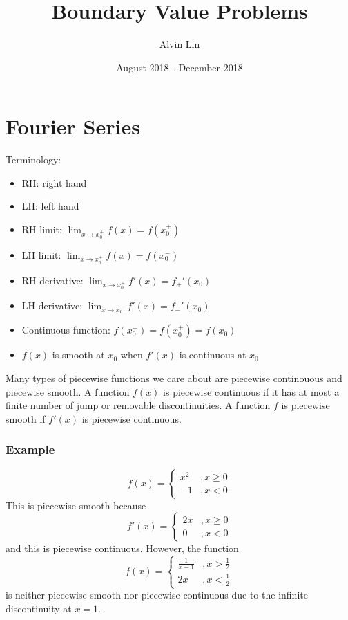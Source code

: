 \documentclass{math}
\title{Boundary Value Problems}
\author{Alvin Lin}
\date{August 2018 - December 2018}
\begin{document}
\maketitle

\section*{Fourier Series}
Terminology:
\begin{itemize}
  \item RH: right hand
  \item LH: left hand
  \item RH limit: \( \lim_{x\to x_0^+}f(x) = f(x_0^+) \)
  \item LH limit: \( \lim_{x\to x_0^+}f(x) = f(x_0^-) \)
  \item RH derivative: \( \lim_{x\to x_0^+}f'(x) = f_+'(x_0) \)
  \item LH derivative: \( \lim_{x\to x_0^-}f'(x) = f_-'(x_0) \)
  \item Continuous function: \( f(x_0^-) = f(x_0^+) = f(x_0) \)
  \item \( f(x) \) is smooth at \( x_0 \) when \( f'(x) \) is continuous at
    \( x_0 \)
\end{itemize}
Many types of piecewise functions we care about are piecewise continouous and
piecewise smooth. A function \( f(x) \) is piecewise continuous if it has at
most a finite number of jump or removable discontinuities. A function \( f \) is
piecewise smooth if \( f'(x) \) is piecewise continuous.

\subsubsection*{Example}
\[ f(x) = \begin{cases}
  x^2 &, x\ge0 \\
  -1 &, x<0
\end{cases} \]
This is piecewise smooth because
\[ f'(x) = \begin{cases}
  2x &, x\ge0 \\
  0 &, x<0
\end{cases} \]
and this is piecewise continuous. However, the function
\[ f(x) = \begin{cases}
  \frac{1}{x-1} &, x>\frac{1}{2} \\
  2x &, x<\frac{1}{2}
\end{cases} \]
is neither piecewise smooth nor piecewise continuous due to the infinite
discontinuity at \( x = 1 \).
\end{document}

